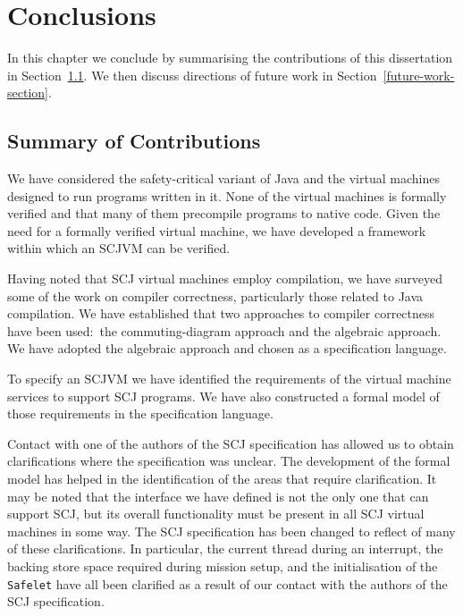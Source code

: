 \chapter{Conclusions}
\label{conclusions-chapter}
In this chapter we conclude by summarising the contributions of this
dissertation in Section~\ref{summary-section}.
We then discuss directions of future work in
Section~\ref{future-work-section}.

\section{Summary of Contributions}
\label{summary-section}

We have considered the safety-critical variant of Java and the virtual
machines designed to run programs written in it.
None of the virtual machines is formally verified and that many of
them precompile programs to native code.
Given the need for a formally verified virtual machine, we have
developed a framework within which an SCJVM can be verified.

Having noted that SCJ virtual machines employ compilation, we have
surveyed some of the work on compiler correctness, particularly those
related to Java compilation.
We have established that two approaches to compiler correctness have
been used:~the commuting-diagram approach and the algebraic approach.
We have adopted the algebraic approach and chosen \Circus{} as a
specification language.

To specify an SCJVM we have identified the requirements
of the virtual machine services to support SCJ programs.
We have also constructed a formal model of those requirements in the
\Circus{} specification language.

Contact with one of the authors of the SCJ specification has allowed
us to obtain clarifications where the specification was unclear.
The development of the formal model has helped in the identification
of the areas that require clarification.
It may be noted that the interface we have defined is not the only one
that can support SCJ, but its overall functionality must be present in
all SCJ virtual machines in some way.
The SCJ specification has been changed to reflect of many of these
clarifications.
In particular, the current thread during an interrupt, the backing
store space required during mission setup, and the initialisation of
the \texttt{Safelet} have all been clarified as a result of our
contact with the authors of the SCJ specification.

